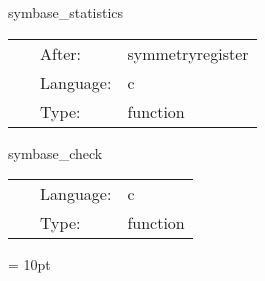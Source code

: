 \vspace{5mm}


\hspace{5mm} symbase\_statistics 

\hspace{5mm}{\it print symmetry boundary face descriptions } 


\hspace{5mm}

 \begin{tabular*}{160mm}{cll} 
~ & After:  & symmetryregister \\ 
~ & Language:  & c \\ 
~ & Type:  & function \\ 
\end{tabular*} 


\vspace{5mm}


\hspace{5mm} symbase\_check 

\hspace{5mm}{\it check whether the driver set up the grid consistently } 


\hspace{5mm}

 \begin{tabular*}{160mm}{cll} 
~ & Language:  & c \\ 
~ & Type:  & function \\ 
\end{tabular*} 



\vspace{5mm}\parskip = 10pt 


